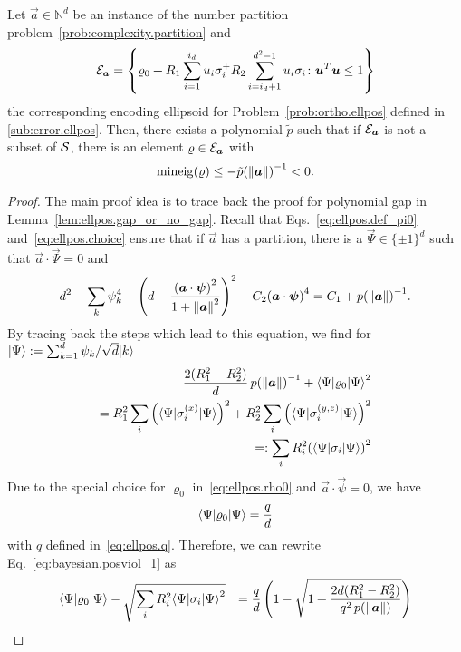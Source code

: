 \begin{lemma}\label{lem:bayesian.positivity_violation}
  Let $\vec a \in \mathbb{N}^d$ be an instance of the number partition problem~\ref{prob:complexity.partition} and
  \[
    \label{eq:bayesian.positivity_violation.ellipsoid}
    \mathcal{E}_{{\boldsymbol{a}}} = \left\{ \varrho_0 + R_1 \sum_{i=1}^{i_d} u_i \sigma_i^ + R_2 \sum_{i=i_d + 1}^{d^2 - 1} u_i \sigma_i \colon {\boldsymbol{u}}^T {\boldsymbol{u}} \le 1 \right\}
  \]
  the corresponding encoding ellipsoid for Problem~\ref{prob:ortho.ellpos} defined in \cref{sub:error.ellpos}.
  Then, there exists a polynomial $\tilde p$ such that if $\mathcal{E}_{{\boldsymbol{a}}}$ is not a subset of $\mathcal{S}$, there is an element $\varrho \in \mathcal{E}_{{\boldsymbol{a}}}$ with
  \[
    \mathrm{mineig}(\varrho) \le -\tilde p{({\Vert{\boldsymbol{a}}\Vert})}^{-1} < 0.
  \]
\end{lemma}
\begin{proof}
  The main proof idea is to trace back the proof for polynomial gap in Lemma~\ref{lem:ellpos.gap_or_no_gap}.
  Recall that Eqs.~\eqref{eq:ellpos.def_pi0} and~\eqref{eq:ellpos.choice} ensure that if $\vec a$ has a partition, there is a $\vec\Psi \in {\{\pm 1\}}^d$ such that $\vec a \cdot \vec\Psi = 0$ and
  \[
    d^2 - \sum_k \psi_k^4 + {\left( d - \frac{{({\boldsymbol{a}} \cdot {\boldsymbol{\psi}})}^2}{1 + {\Vert{\boldsymbol{a}}\Vert}^2} \right)}^2 - C_2 {({\boldsymbol{a}} \cdot {\boldsymbol{\psi}})}^4 = C_1 + p{({\Vert{\boldsymbol{a}}\Vert})}^{-1}.
  \]
  By tracing back the steps which lead to this equation, we find for $\ket{\Psi} := \sum_{k=1}^d \psi_k / \sqrt{d} \ket{k}$
  \begin{align}
    \label{eq:bayesian.posviol_1}
    \frac{2 (R_1^2 - R_2^2)}{d} \, p{(\norm{\vec a})}^{-1} + \bra{\Psi} \varrho_0 \ket{\Psi}^2 \\
    = R_1^2 \sum_i {\left( \bra\Psi \sigma_i^{(x)} \ket\Psi \right)}^2 + R_2^2 \sum_i {\left( \bra\Psi \sigma_i^{(y,z)} \ket\Psi \right)}^2 \\
    =: \sum_i R_i^2 {\left( \bra\Psi \sigma_i \ket\Psi \right)}^2
  \end{align}
  Due to the special choice for $\varrho_0$ in~\eqref{eq:ellpos.rho0} and $\vec a \cdot \vec \psi = 0$, we have
  \[
    \bra\Psi\varrho_0\ket\Psi = \frac{q}{d}
  \]
  with $q$ defined in~\eqref{eq:ellpos.q}.
  Therefore, we can rewrite Eq.~\eqref{eq:bayesian.posviol_1} as
  \begin{align}
    \bra\Psi \varrho_0 \ket\Psi - \sqrt{\sum_i R_i^2 \bra\Psi \sigma_i \ket\Psi^2}
    &&= \frac{q}{d} \left( 1 - \sqrt{1 + \frac{2d (R_1^2 - R_2^2)}{q^2 \, p(\norm{\vec a})}} \right) \nonumber\\

\end{align}
\end{proof}
